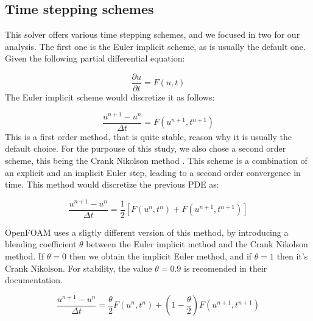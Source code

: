 \documentclass[
  english,        %
  font=times,     %
  onecolumn,      %
]{tumarticle}
\begin{document}
\subsection{Time stepping schemes}
This solver offers various time stepping schemes, and we focused in two for our analysis. The first one is the Euler implicit scheme, as is usually the default one. Given the following partial differential equation:

\begin{equation}
    \frac{\partial u}{\partial t} = F(u, t)
\end{equation}
The Euler implicit scheme would discretize it as follows:

\begin{equation}
    \frac{u^{n+1} - u^n}{\Delta t} = {F}(u^{n+1}, t^{n+1})
\end{equation}
This is a first order method, that is quite stable, reason why it is usually the default choice. For the purpouse of this study, we also chose a second order scheme, this being the Crank Nikolson method \cite{crank1947practical}. This scheme is a combination of an explicit and an implicit Euler step, leading to a second order convergence in time. This method would discretize the previous PDE as: 

\begin{equation}
    \frac{u^{n+1} - u^n}{\Delta t} = \frac{1}{2} \left[F(u^n, t^n) +  F(u^{n+1}, t^{n+1}) \right]
\end{equation}


OpenFOAM uses a sligtly different version of this method, by introducing a blending coefficient $\theta$ between the Euler implicit method and the Crank Nikolson method. If $\theta = 0$ then we obtain the implicit Euler method, and if $\theta = 1$ then it's Crank Nikolson. For stability, the value $\theta = 0.9$ is recomended in their documentation.

\begin{equation}
    \frac{u^{n+1} - u^n}{\Delta t} = \frac{\theta}{2} F(u^{n}, t^{n}) + \left( 1 - \frac{\theta}{2} \right) F(u^{n+1}, t^{n+1})
\end{equation}

\end{document}
